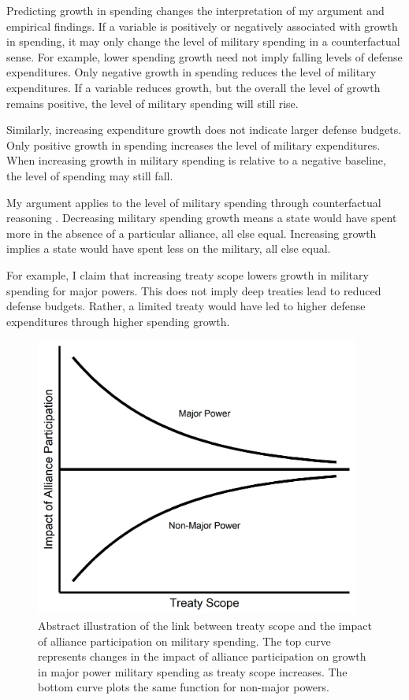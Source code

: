 \documentclass[12pt]{article}
\begin{document}
Predicting growth in spending changes the interpretation of my argument and empirical findings. 
If a variable is positively or negatively associated with growth in spending, it may only change the level of military spending in a counterfactual sense. 
For example, lower spending growth need not imply falling levels of defense expenditures. 
Only negative growth in spending reduces the level of military expenditures. 
If a variable reduces growth, but the overall the level of growth remains positive, the level of military spending will still rise. 


Similarly, increasing expenditure growth does not indicate larger defense budgets. 
Only positive growth in spending increases the level of military expenditures. 
When increasing growth in military spending is relative to a negative baseline, the level of spending may still fall. 


My argument applies to the level of military spending through counterfactual reasoning \citep{Fearon1991}. 
Decreasing military spending growth means a state would have spent more in the absence of a particular alliance, all else equal. 
Increasing growth implies a state would have spent less on the military, all else equal.


For example, I claim that increasing treaty scope lowers growth in military spending for major powers. 
This does not imply deep treaties lead to reduced defense budgets. 
Rather, a limited treaty would have led to higher defense expenditures through higher spending growth. 


\begin{figure}[htbp]
	\centering
		\includegraphics[width=0.95\textwidth]{../figures/illus-arg.png}
	\caption{Abstract illustration of the link between treaty scope and the impact of alliance participation on military spending.
	The top curve represents changes in the impact of alliance participation on growth in major power military spending as treaty scope increases.
	The bottom curve plots the same function for non-major powers.}
	\label{fig:illus-arg}
\end{figure}
\end{document}
